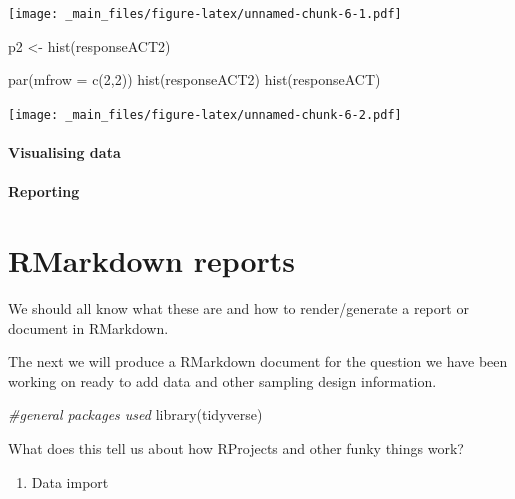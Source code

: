 \documentclass[
]{book}
\newenvironment{Shaded}{\begin{snugshade}}{\end{snugshade}}
\newcommand{\AttributeTok}[1]{\textcolor[rgb]{0.77,0.63,0.00}{#1}}
\newcommand{\CommentTok}[1]{\textcolor[rgb]{0.56,0.35,0.01}{\textit{#1}}}
\newcommand{\DecValTok}[1]{\textcolor[rgb]{0.00,0.00,0.81}{#1}}
\newcommand{\FunctionTok}[1]{\textcolor[rgb]{0.00,0.00,0.00}{#1}}
\newcommand{\NormalTok}[1]{#1}
\newcommand{\OtherTok}[1]{\textcolor[rgb]{0.56,0.35,0.01}{#1}}
\providecommand{\tightlist}{%
  \setlength{\itemsep}{0pt}\setlength{\parskip}{0pt}}
\begin{document}
\texttt{[image: \_main\_files/figure-latex/unnamed-chunk-6-1.pdf]}

\begin{Shaded}
\begin{Highlighting}[]
\NormalTok{ p2 }\OtherTok{\textless{}{-}} \FunctionTok{hist}\NormalTok{(responseACT2)}
 
 \FunctionTok{par}\NormalTok{(}\AttributeTok{mfrow =} \FunctionTok{c}\NormalTok{(}\DecValTok{2}\NormalTok{,}\DecValTok{2}\NormalTok{))}
 \FunctionTok{hist}\NormalTok{(responseACT2)}
 \FunctionTok{hist}\NormalTok{(responseACT)}
\end{Highlighting}
\end{Shaded}

\texttt{[image: \_main\_files/figure-latex/unnamed-chunk-6-2.pdf]}

\hypertarget{visualising-data}{%
\subsubsection{Visualising data}\label{visualising-data}}

\hypertarget{reporting}{%
\subsubsection{Reporting}\label{reporting}}

\hypertarget{rmarkdown-reports}{%
\chapter{RMarkdown reports}\label{rmarkdown-reports}}

We should all know what these are and how to render/generate a report or document in RMarkdown.

The next we will produce a RMarkdown document for the question we have been working on ready to add data and other sampling design information.

\begin{Shaded}
\begin{Highlighting}[]
\CommentTok{\#general packages used}
\FunctionTok{library}\NormalTok{(tidyverse)}
\end{Highlighting}
\end{Shaded}

What does this tell us about how RProjects and other funky things work?

\begin{enumerate}
\def\labelenumi{\arabic{enumi}.}
\setcounter{enumi}{2}
\tightlist
\item
  Data import
\end{enumerate}
\end{document}
